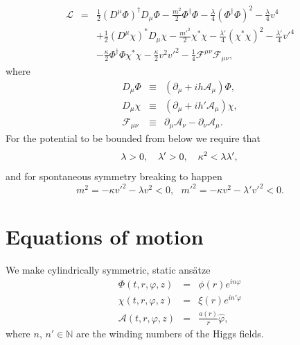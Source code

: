 \documentclass[12pt,a4paper]{article}
\begin{document}
\begin{eqnarray} 
\mathcal{L} & = & \frac{1}{2}(D^{\mu}\Phi)^{\dagger}D_{\mu}\Phi - \frac{m^2}{2}\Phi^{\dagger}\Phi - \frac{\lambda}{4}(\Phi^{\dagger}\Phi)^2 -\frac{\lambda}{4}v^4   \nonumber\\
 & & +\frac{1}{2}(D^{\mu} \chi)^*D_{\mu} \chi - \frac{m'^2}{2}\chi^*\chi - \frac{\lambda'}{4}(\chi^* \chi)^2 -\frac{\lambda'}{4}v'^4\nonumber \\ 
 & & -\frac{\kappa}{2}\Phi^\dagger\Phi\chi^*\chi  -\frac{\kappa}{2}v^2v'^2 -\frac{1}{4}\mathcal{F}^{\mu\nu}\mathcal{F}_{\mu\nu}, %
\end{eqnarray}
where 
\begin{eqnarray*}
D_{\mu} \Phi & \equiv & (\partial_{\mu} + ih\mathcal{A}_{\mu})\Phi, \\ 
D_{\mu} \chi & \equiv & (\partial_{\mu} + ih'\mathcal{A}_{\mu})\chi, \\
\mathcal{F}_{\mu\nu} & \equiv & \partial_{\mu}\mathcal{A}_{\nu}-\partial_{\nu}\mathcal{A}_{\mu}.%
\end{eqnarray*}
For the potential to be bounded from below we require that
\begin{equation}
	\label{eq:constraints}
	\lambda>0, \ \ \ \lambda'>0, \ \ \ \kappa^2 < \lambda \lambda',\nonumber \\ 
\end{equation}
and for spontaneous symmetry breaking to happen
\begin{equation}
 m^2 = -\kappa v'^2 - \lambda v^2<0,\ \ \ m'^2 = -\kappa v^2 - \lambda' v'^2<0.
\end{equation}
\section{Equations of motion}
We make cylindrically symmetric, static ans\"{a}tze 
\begin{eqnarray}
	\Phi(t,r,\varphi,z) & = & \phi(r) e^{in\varphi}\nonumber \\
	\chi(t,r,\varphi,z) & = & \xi(r) e^{in'\varphi}\nonumber \\
	\mathcal{A}(t,r,\varphi,z) & = & \frac{a(r)}{r}\hat{\varphi},
\end{eqnarray}
where $n$, $n'\in\mathbb{N}$ are the winding numbers of the Higgs fields.
\end{document}
